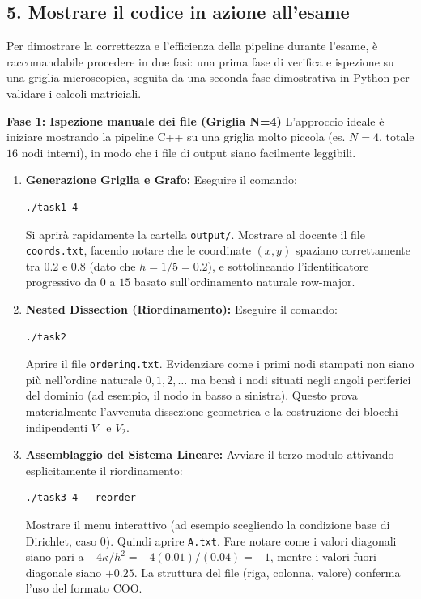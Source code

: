 \documentclass[a4paper,11pt]{article}
\theoremstyle{definition}
\begin{document}
\subsection{5. Mostrare il codice in azione all'esame}
Per dimostrare la correttezza e l'efficienza della pipeline durante l'esame, è raccomandabile procedere in due fasi: una prima fase di verifica e ispezione su una griglia microscopica, seguita da una seconda fase dimostrativa in Python per validare i calcoli matriciali.

\textbf{Fase 1: Ispezione manuale dei file (Griglia N=4)}
L'approccio ideale è iniziare mostrando la pipeline C++ su una griglia molto piccola (es. $N=4$, totale $16$ nodi interni), in modo che i file di output siano facilmente leggibili.

\begin{enumerate}
    \item \textbf{Generazione Griglia e Grafo:}
    Eseguire il comando:
    \begin{lstlisting}[style=cpp]
    ./task1 4
    \end{lstlisting}
    Si aprirà rapidamente la cartella \texttt{output/}. Mostrare al docente il file \texttt{coords.txt}, facendo notare che le coordinate $(x,y)$ spaziano correttamente tra $0.2$ e $0.8$ (dato che $h = 1/5 = 0.2$), e sottolineando l'identificatore progressivo da $0$ a $15$ basato sull'ordinamento naturale row-major.

    \item \textbf{Nested Dissection (Riordinamento):}
    Eseguire il comando:
    \begin{lstlisting}[style=cpp]
    ./task2
    \end{lstlisting}
    Aprire il file \texttt{ordering.txt}. Evidenziare come i primi nodi stampati non siano più nell'ordine naturale $0, 1, 2, \dots$ ma bensì i nodi situati negli angoli periferici del dominio (ad esempio, il nodo in basso a sinistra). Questo prova materialmente l'avvenuta dissezione geometrica e la costruzione dei blocchi indipendenti $V_1$ e $V_2$.

    \item \textbf{Assemblaggio del Sistema Lineare:}
    Avviare il terzo modulo attivando esplicitamente il riordinamento:
    \begin{lstlisting}[style=cpp]
    ./task3 4 --reorder
    \end{lstlisting}
    Mostrare il menu interattivo (ad esempio scegliendo la condizione base di Dirichlet, caso 0). Quindi aprire \texttt{A.txt}. Fare notare come i valori diagonali siano pari a $-4\kappa/h^2 = -4(0.01)/(0.04) = -1$, mentre i valori fuori diagonale siano $+0.25$. La struttura del file (riga, colonna, valore) conferma l'uso del formato COO.
\end{enumerate}
\end{document}
